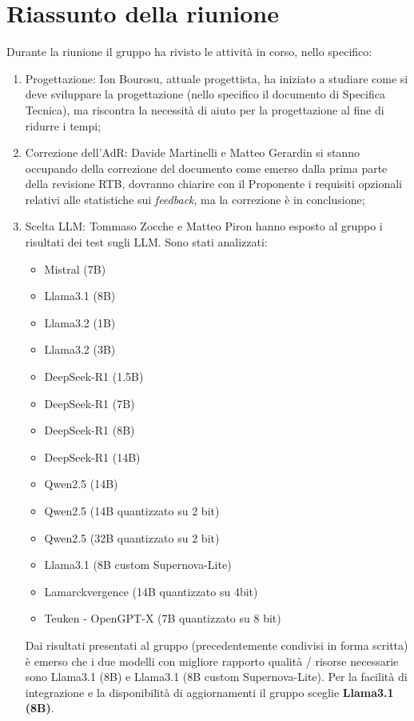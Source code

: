 \section{Riassunto della riunione}
Durante la riunione il gruppo ha rivisto le attività in corso, nello specifico:
\begin{enumerate}


    \item Progettazione: Ion Bourosu, attuale progettista, ha iniziato a studiare come si deve sviluppare la progettazione (nello specifico il documento di Specifica Tecnica), ma riscontra la necessità di aiuto per la progettazione al fine di ridurre i tempi;
    \item Correzione dell'AdR: Davide Martinelli e Matteo Gerardin si stanno occupando della correzione del documento come emerso dalla prima parte della revisione RTB, dovranno chiarire con il Proponente i requisiti opzionali relativi alle statistiche sui \textit{feedback}, ma la correzione è in conclusione;
    \item Scelta LLM: Tommaso Zocche e Matteo Piron hanno esposto al gruppo i risultati dei test sugli LLM. Sono stati analizzati:
\begin{multicols}{2}
    \begin{itemize}
        \item Mistral (7B)
        \item Llama3.1 (8B)
        \item Llama3.2 (1B)
        \item Llama3.2 (3B)
        \item DeepSeek-R1 (1.5B)
        \item DeepSeek-R1 (7B)
        \item DeepSeek-R1 (8B)
        \item DeepSeek-R1 (14B)
        \item Qwen2.5 (14B)
        \item Qwen2.5 (14B quantizzato su 2 bit)
        \item Qwen2.5 (32B quantizzato su 2 bit)
        \item Llama3.1 (8B custom Supernova-Lite)
        \item Lamarckvergence (14B quantizzato su 4bit)
        \item Teuken - OpenGPT-X (7B quantizzato su 8 bit)
    \end{itemize}
\end{multicols}
    Dai risultati presentati al gruppo (precedentemente condivisi in forma scritta) è emerso che i due modelli con migliore rapporto qualità / risorse necessarie sono Llama3.1 (8B) e Llama3.1 (8B custom Supernova-Lite). Per la facilità di integrazione e la disponibilità di aggiornamenti il gruppo sceglie \textbf{Llama3.1 (8B)}.

\end{enumerate}
